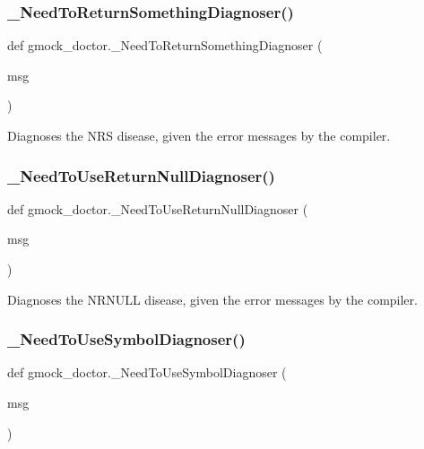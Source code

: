 \subsubsection{\texorpdfstring{\_NeedToReturnSomethingDiagnoser()}{\_NeedToReturnSomethingDiagnoser()}}
{\footnotesize\ttfamily def gmock\+\_\+doctor.\+\_\+\+Need\+To\+Return\+Something\+Diagnoser (\begin{DoxyParamCaption}\item[{}]{msg }\end{DoxyParamCaption})\hspace{0.3cm}{\ttfamily [private]}}

\begin{DoxyVerb}Diagnoses the NRS disease, given the error messages by the compiler.\end{DoxyVerb}
 \mbox{\label{namespacegmock__doctor_af4268f4fc3c0e612231b6a5d53e9e578}} 
\subsubsection{\texorpdfstring{\_NeedToUseReturnNullDiagnoser()}{\_NeedToUseReturnNullDiagnoser()}}
{\footnotesize\ttfamily def gmock\+\_\+doctor.\+\_\+\+Need\+To\+Use\+Return\+Null\+Diagnoser (\begin{DoxyParamCaption}\item[{}]{msg }\end{DoxyParamCaption})\hspace{0.3cm}{\ttfamily [private]}}

\begin{DoxyVerb}Diagnoses the NRNULL disease, given the error messages by the compiler.\end{DoxyVerb}
 \mbox{\label{namespacegmock__doctor_a9ee9925aa81453f121d44e0ad8f1bbaf}} 
\subsubsection{\texorpdfstring{\_NeedToUseSymbolDiagnoser()}{\_NeedToUseSymbolDiagnoser()}}
{\footnotesize\ttfamily def gmock\+\_\+doctor.\+\_\+\+Need\+To\+Use\+Symbol\+Diagnoser (\begin{DoxyParamCaption}\item[{}]{msg }\end{DoxyParamCaption})\hspace{0.3cm}{\ttfamily [private]}}

